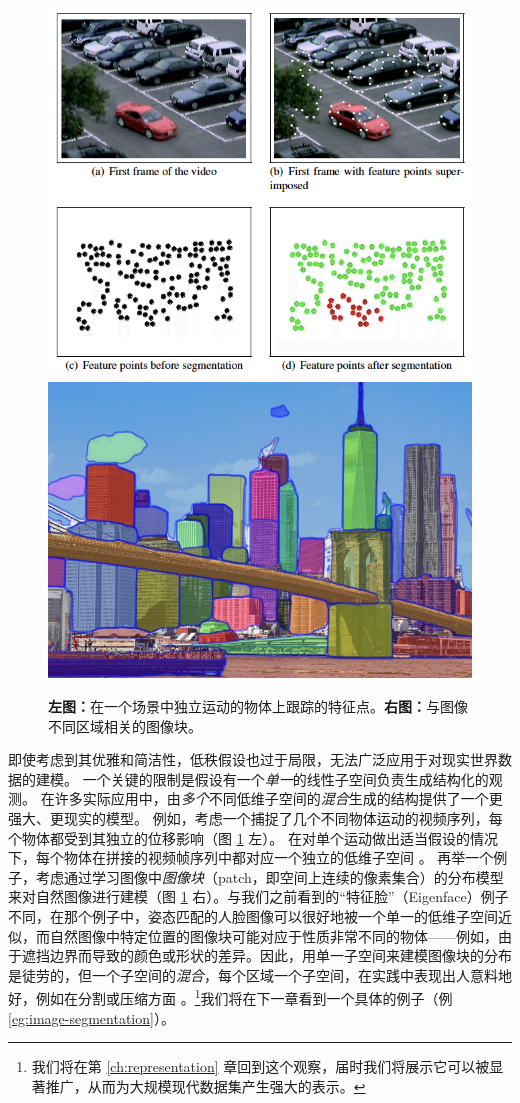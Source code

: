 \documentclass[../../book-main.tex]{subfiles}
\begin{document}
\begin{figure}
    \centering
    \includegraphics[height=0.35\linewidth]{figs_chap2/motion.png} \hspace{5mm}
    \includegraphics[height=0.349\linewidth]{figs_chap2/segment.png} 
    \caption{\textbf{左图：}在一个场景中独立运动的物体上跟踪的特征点。\textbf{右图：}与图像不同区域相关的图像块。}
    \label{fig:multiple-subspaces}
\end{figure}
即使考虑到其优雅和简洁性，低秩假设也过于局限，无法广泛应用于对现实世界数据的建模。
一个关键的限制是假设有一个\textit{单一}的线性子空间负责生成结构化的观测。
在许多实际应用中，由\textit{多个}不同低维子空间的\textit{混合}生成的结构提供了一个更强大、更现实的模型。
例如，考虑一个捕捉了几个不同物体运动的视频序列，每个物体都受到其独立的位移影响（图 \ref{fig:multiple-subspaces} 左）。
在对单个运动做出适当假设的情况下，每个物体在拼接的视频帧序列中都对应一个独立的低维子空间 \cite{VidalR2004-ECCV}。
再举一个例子，考虑通过学习图像中\textit{图像块}（patch，即空间上连续的像素集合）的分布模型来对自然图像进行建模（图 \ref{fig:multiple-subspaces} 右）。与我们之前看到的“特征脸”（Eigenface）例子不同，在那个例子中，姿态匹配的人脸图像可以很好地被一个单一的低维子空间近似，而自然图像中特定位置的图像块可能对应于性质非常不同的物体——例如，由于遮挡边界而导致的颜色或形状的差异。因此，用单一子空间来建模图像块的分布是徒劳的，但一个子空间的\textit{混合}，每个区域一个子空间，在实践中表现出人意料地好，例如在分割或压缩方面 \cite{Mobahi-IJCV2011}。\footnote{我们将在第 \ref{ch:representation} 章回到这个观察，届时我们将展示它可以被显著推广，从而为大规模现代数据集产生强大的表示。}我们将在下一章看到一个具体的例子（例 \ref{eg:image-segmentation}）。
\end{document}
